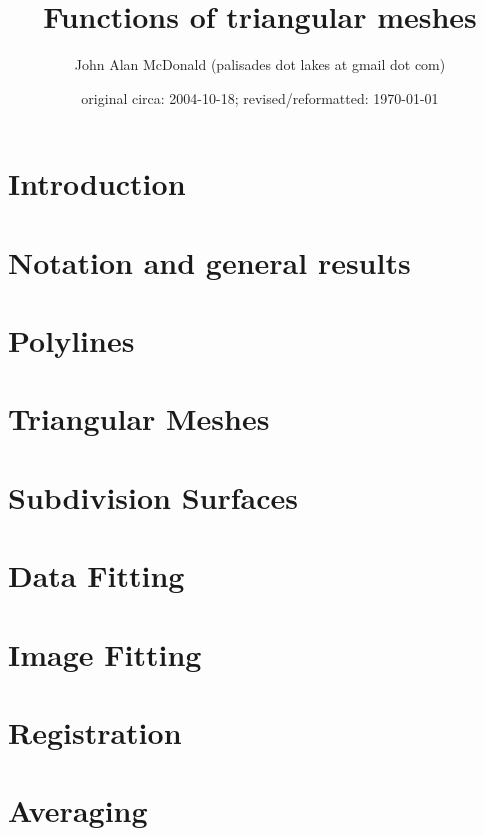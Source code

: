 \documentclass{PalisadesLakesReport}
\title{Functions of triangular meshes}
\author{John Alan McDonald (palisades dot lakes at gmail dot com)}
\date{original circa: 2004-10-18; revised/reformatted: \today}
\begin{document}
\maketitle
\PalisadesLakesTableOfContents



\section{Introduction}


\section{Notation and general results}



\section{Polylines}


\section{Triangular Meshes}




\section{Subdivision Surfaces}



\section{Data Fitting}


\section{Image Fitting}


\section{Registration}


\section{Averaging}


\end{document}

